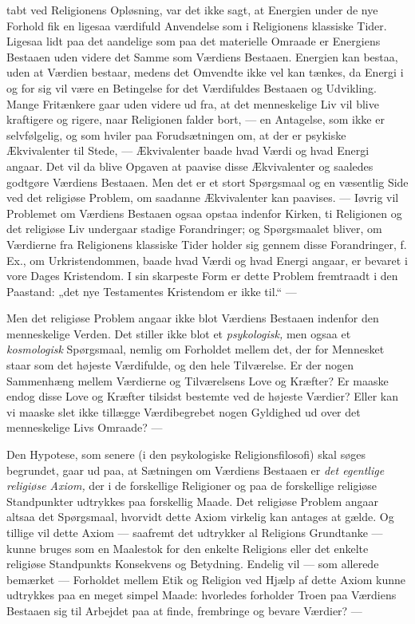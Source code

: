 \documentclass[12pt,a4paper,openany]{book}
\newcommand{\opage}[1]{\marginnote{\footnotesize\textit{[#1]}}}
\begin{document}
tabt ved Religionens Opløsning, var det ikke sagt, at Energien under de
nye Forhold fik en ligesaa værdifuld Anvendelse som i Religionens
klassiske Tider. Ligesaa lidt paa det aandelige som paa det materielle
Omraade er Energiens Bestaaen uden videre det Samme som Værdiens
Bestaaen. Energien kan bestaa, uden at Værdien bestaar, medens det
Omvendte ikke vel kan tænkes, da Energi i og for sig vil være en
Betingelse for det Værdifuldes Bestaaen og Udvikling. Mange Fritænkere
gaar uden videre ud fra, at det menneskelige Liv vil blive kraftigere og
rigere, naar Religionen falder bort, --- en Antagelse, som ikke er
selvfølgelig, og som hviler paa Forudsætningen om, at der er psykiske
Ækvivalenter til Stede, --- Ækvivalenter baade hvad Værdi og hvad Energi
angaar. Det vil da blive Opgaven at paavise disse Ækvivalenter og
saaledes godtgøre Værdiens Bestaaen. Men det er et stort Spørgsmaal og
en væsentlig Side ved det religiøse Problem, om saadanne Ækvivalenter
kan paavises. --- Iøvrig vil Problemet om Værdiens Bestaaen ogsaa opstaa
indenfor Kirken, ti Religionen og det religiøse Liv undergaar stadige
Forandringer; og Spørgsmaalet bliver, om Værdierne fra Religionens
klassiske Tider holder sig gennem disse Forandringer, f. Ex., om
Urkristendommen, baade hvad Værdi og hvad Energi angaar, er bevaret i
vore Dages Kristendom. I sin skarpeste Form er dette Problem
\opage{9}fremtraadt i den Paastand: „det nye Testamentes Kristendom er
ikke til.“ ---

Men det religiøse Problem angaar ikke blot Værdiens Bestaaen indenfor
den menneskelige Verden. Det stiller ikke blot et \textit{psykologisk,}
men ogsaa et \textit{kosmologisk} Spørgsmaal, nemlig om Forholdet mellem
det, der for Mennesket staar som det højeste Værdifulde, og den hele
Tilværelse. Er der nogen Sammenhæng mellem Værdierne og Tilværelsens
Love og Kræfter? Er maaske endog disse Love og Kræfter tilsidst bestemte
ved de højeste Værdier? Eller kan vi maaske slet ikke tillægge
Værdibegrebet nogen Gyldighed ud over det menneskelige Livs Omraade? ---

Den Hypotese, som senere (i den psykologiske Religionsfilosofi) skal
søges begrundet, gaar ud paa, at Sætningen om Værdiens Bestaaen er
\textit{det egentlige religiøse Axiom,} der i de forskellige Religioner
og paa de forskellige religiøse Standpunkter udtrykkes paa forskellig
Maade. Det religiøse Problem angaar altsaa det Spørgsmaal, hvorvidt
dette Axiom virkelig kan antages at gælde. Og tillige vil dette Axiom
--- saafremt det udtrykker al Religions Grundtanke --- kunne bruges som
en Maalestok for den enkelte Religions eller det enkelte religiøse
Standpunkts Konsekvens og Betydning. Endelig vil --- som allerede
bemærket --- Forholdet mellem Etik og Religion ved Hjælp af dette Axiom
kunne udtrykkes paa en meget simpel Maade: hvorledes forholder Troen paa
Værdiens Bestaaen sig til Arbejdet paa at finde, frembringe og bevare
Værdier? ---
\end{document}
